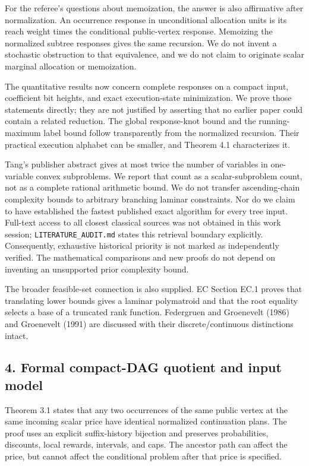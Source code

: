 \documentclass[
  11pt,
]{article}
\begin{document}
For the referee's questions about memoization, the answer is also
affirmative after normalization. An occurrence response in unconditional
allocation units is its reach weight times the conditional public-vertex
response. Memoizing the normalized subtree responses gives the same
recursion. We do not invent a stochastic obstruction to that
equivalence, and we do not claim to originate scalar marginal allocation
or memoization.

The quantitative results now concern complete responses on a compact
input, coefficient bit heights, and exact execution-state minimization.
We prove those statements directly; they are not justified by asserting
that no earlier paper could contain a related reduction. The global
response-knot bound and the running-maximum label bound follow
transparently from the normalized recursion. Their practical execution
alphabet can be smaller, and Theorem 4.1 characterizes it.

Tang's publisher abstract gives at most twice the number of variables in
one-variable convex subproblems. We report that count as a
scalar-subproblem count, not as a complete rational arithmetic bound. We
do not transfer ascending-chain complexity bounds to arbitrary branching
laminar constraints. Nor do we claim to have established the fastest
published exact algorithm for every tree input. Full-text access to all
closest classical sources was not obtained in this work session;
\texttt{LITERATURE\_AUDIT.md} states this retrieval boundary explicitly.
Consequently, exhaustive historical priority is not marked as
independently verified. The mathematical comparisons and new proofs do
not depend on inventing an unsupported prior complexity bound.

The broader feasible-set connection is also supplied. EC Section EC.1
proves that translating lower bounds gives a laminar polymatroid and
that the root equality selects a base of a truncated rank function.
Federgruen and Groenevelt (1986) and Groenevelt (1991) are discussed
with their discrete/continuous distinctions intact.

\subsection{4. Formal compact-DAG quotient and input
model}\label{formal-compact-dag-quotient-and-input-model}

Theorem 3.1 states that any two occurrences of the same public vertex at
the same incoming scalar price have identical normalized continuation
plans. The proof uses an explicit suffix-history bijection and preserves
probabilities, discounts, local rewards, intervals, and caps. The
ancestor path can affect the price, but cannot affect the conditional
problem after that price is specified.
\end{document}
